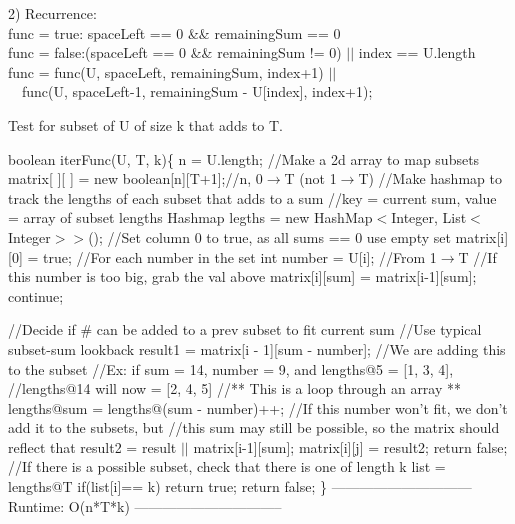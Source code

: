 \documentclass[12pt]{article}
\begin{document}
\pagebreak


2) Recurrence: \\
func =  true: spaceLeft == 0 \&\& remainingSum == 0\\
func = false:(spaceLeft == 0 \&\& remainingSum != 0) $||$ index == U.length\\
func = func(U, spaceLeft, remainingSum, index+1) $||$\\
\indent \indent \ \ func(U, spaceLeft-1, remainingSum - U[index], index+1);\\


\begin{algorithm}[H]
\caption{Test for subset of U of size k that adds to T.}
\begin{algorithmic} [1]
\State boolean iterFunc(U, T, k)\{
\State
\State n = U.length;
\State 
\State //Make a 2d array to map subsets
\State matrix[ ][ ] = new boolean[n][T+1];\indent //n, 0$\to$T (not 1$\to$T)
\State 
\State //Make hashmap to track the lengths of each subset that adds to a sum
\State //key = current sum, value = array of subset lengths
\State Hashmap legths = new HashMap$<$Integer, List$<$Integer$>>$();
\State 
\State //Set column 0 to true, as all sums == 0 use empty set
\State matrix[i][0] = true;
\EndFor
\State 
\State //For each number in the set
\State int number = U[i];
\State 
\State //From 1$\to$T
\State 
\State//If this number is too big, grab the val above
\State matrix[i][sum] = matrix[i-1][sum];
\State continue;
\EndIf
\State

\end{algorithmic}
\end{algorithm}


\begin{algorithm}                     
\begin{algorithmic} [1]

\State 
\State //Decide if \# can be added to a prev subset to fit current sum
\State //Use typical subset-sum lookback
\State result1 = matrix[i - 1][sum - number];
\State
{}
\State //We are adding this to the subset
\State //Ex: if sum = 14, number = 9, and lengths@5 = [1, 3, 4],
\State //lengths@14 will now = [2, 4, 5]
\State //** This is a loop through an array **
\State lengths@sum = lengths@(sum - number)++;
\EndIf
\State
\State //If this number won't fit, we don't add it to the subsets, but
\State //this sum may still be possible, so the matrix should reflect that
\State result2 = result $||$ matrix[i-1][sum];
\State matrix[i][j] = result2;
\EndFor
\EndFor
\State
\State
{}
\State return false;
\EndIf
\State
\State //If there is a possible subset, check that there is one of length k
\State list = lengths@T
\State
{}
\State if(list[i]== k) return true;
\EndFor
\State return false;
\State\}
\State
\State
\State ------------------------------ Runtime: O(n*T*k) --------------------------------
\end{algorithmic}
\end{algorithm}
\end{document}
